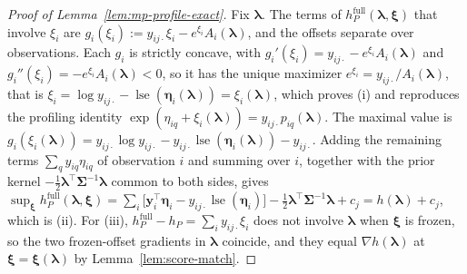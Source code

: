 \begin{proof}[Proof of Lemma~\ref{lem:mp-profile-exact}]
Fix $\bm{\lambda}$. The terms of $h_{P}^{\mathrm{full}}(\bm{\lambda},\bm{\xi})$ that involve $\xi_{i}$ are $g_{i}(\xi_{i}):=y_{ij\cdot}\xi_{i}-e^{\xi_{i}}A_{i}(\bm{\lambda})$, and the offsets separate over observations. Each $g_{i}$ is strictly concave, with $g_{i}'(\xi_{i})=y_{ij\cdot}-e^{\xi_{i}}A_{i}(\bm{\lambda})$ and $g_{i}''(\xi_{i})=-e^{\xi_{i}}A_{i}(\bm{\lambda})<0$, so it has the unique maximizer $e^{\xi_{i}}=y_{ij\cdot}/A_{i}(\bm{\lambda})$, that is $\xi_{i}=\log y_{ij\cdot}-\operatorname{lse}(\bm{\eta}_{i}(\bm{\lambda}))=\xi_{i}(\bm{\lambda})$, which proves (i) and reproduces the profiling identity $\exp(\eta_{iq}+\xi_{i}(\bm{\lambda}))=y_{ij\cdot}p_{iq}(\bm{\lambda})$. The maximal value is $g_{i}(\xi_{i}(\bm{\lambda}))=y_{ij\cdot}\log y_{ij\cdot}-y_{ij\cdot}\operatorname{lse}(\bm{\eta}_{i}(\bm{\lambda}))-y_{ij\cdot}$. Adding the remaining terms $\sum_{q}y_{iq}\eta_{iq}$ of observation $i$ and summing over $i$, together with the prior kernel $-\frac{1}{2}\bm{\lambda}^{\top}\bm{\Sigma}^{-1}\bm{\lambda}$ common to both sides, gives $\sup_{\bm{\xi}}h_{P}^{\mathrm{full}}(\bm{\lambda},\bm{\xi})=\sum_{i}\big[\bm{y}_{i}^{\top}\bm{\eta}_{i}-y_{ij\cdot}\operatorname{lse}(\bm{\eta}_{i})\big]-\frac{1}{2}\bm{\lambda}^{\top}\bm{\Sigma}^{-1}\bm{\lambda}+c_{j}=h(\bm{\lambda})+c_{j}$, which is (ii). For (iii), $h_{P}^{\mathrm{full}}-h_{P}=\sum_{i}y_{ij\cdot}\xi_{i}$ does not involve $\bm{\lambda}$ when $\bm{\xi}$ is frozen, so the two frozen-offset gradients in $\bm{\lambda}$ coincide, and they equal $\nabla h(\bm{\lambda})$ at $\bm{\xi}=\bm{\xi}(\bm{\lambda})$ by Lemma~\ref{lem:score-match}.
\end{proof}


